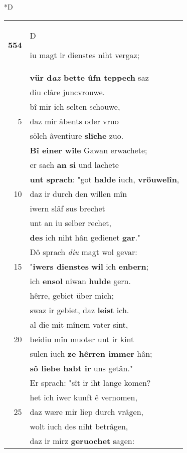 \documentclass[8pt,a4paper,notitlepage]{article}
\begin{document}
\begin{table}[ht]
\begin{minipage}[t]{0.5\linewidth}
\small
\begin{center}*D
\end{center}
\begin{tabular}{rl}
\textbf{554} & \begin{large}D\end{large}iu magt ir dienstes niht vergaz;\\ 
 & \textbf{vür d\textit{az} bette ûfn teppech} saz\\ 
 & diu clâre juncvrouwe.\\ 
 & bî mir ich selten schouwe,\\ 
5 & daz mir âbents oder vruo\\ 
 & sölch âventiure \textbf{slîche} zuo.\\ 
 & \textbf{Bî einer wîle} Gawan erwachete;\\ 
 & er sach \textbf{an si} und lachete\\ 
 & \textbf{unt sprach}: "got \textbf{halde} iuch, \textbf{vröuwelîn},\\ 
10 & daz ir durch den willen mîn\\ 
 & iwern slâf sus brechet\\ 
 & unt an iu selber rechet,\\ 
 & \textbf{des} ich niht hân gedienet \textbf{gar}."\\ 
 & Dô sprach \textit{diu} magt wol gevar:\\ 
15 & "\textbf{iwers dienstes} \textbf{wil} ich \textbf{enbern};\\ 
 & ich \textbf{ensol} niwan \textbf{hulde} gern.\\ 
 & hêrre, gebiet über mich;\\ 
 & swaz ir gebiet, daz \textbf{leist} ich.\\ 
 & al die mit mînem vater sint,\\ 
20 & beidiu mîn muoter unt ir kint\\ 
 & sulen iuch \textbf{ze hêrren immer} hân;\\ 
 & \textbf{sô liebe habt ir} uns getân."\\ 
 & Er sprach: "sît ir iht lange komen?\\ 
 & het ich iwer kunft ê vernomen,\\ 
25 & daz wære mir liep durch vrâgen,\\ 
 & wolt iuch des niht betrâgen,\\ 
 & daz ir mirz \textbf{geruochet} sagen:\\ 

\end{tabular}
\end{minipage}
\end{table}
\end{document}
